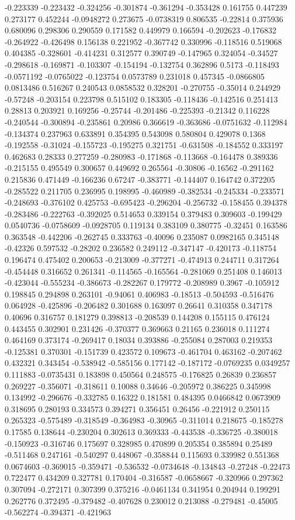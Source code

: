 -0.223339 -0.223432 -0.324256 -0.301874 -0.361294 -0.353428 0.161755 0.447239 0.273177 0.452244 -0.0948272 0.273675 -0.0738319 0.806535 -0.22814 0.375936 0.680096 0.298306 0.290559 0.171582 0.449979 0.166594 -0.202623 -0.176832 -0.264922 -0.426498 0.156138 0.221952 -0.367742 0.330996 -0.118516 0.519068 0.404385 -0.328601 -0.414231 0.312577 0.390749 -0.147965 0.324054 -0.34527 -0.298618 -0.169871 -0.103307 -0.154194 -0.132754 0.362896 0.5173 -0.118493 -0.0571192 -0.0765022 -0.123754 0.0573789 0.231018 0.457345 -0.0866805 0.0813486 0.516267 0.240543 0.0858532 0.328201 -0.270755 -0.35014 0.244929 -0.57248 -0.203154 0.223798 0.515102 0.183305 -0.118436 -0.142516 0.251413 0.28813 0.203921 0.169256 -0.25744 -0.201486 -0.225393 -0.21342 0.116228 -0.240544 -0.300894 -0.235861 0.20986 0.366619 -0.363686 -0.0751632 -0.112984 -0.134374 0.237963 0.633891 0.354395 0.543098 0.580804 0.429078 0.1368 -0.192558 -0.31024 -0.155723 -0.195275 0.321751 -0.631508 -0.184552 0.333197 0.462683 0.28333 0.277259 -0.280983 -0.171868 -0.113668 -0.164478 0.389336 -0.215155 0.495549 0.300657 0.449692 0.265564 -0.30806 -0.16562 -0.291162 0.215836 0.471449 -0.166236 0.67247 -0.383771 -0.144407 0.164742 0.372205 -0.285522 0.211705 0.236995 0.198995 -0.460989 -0.382534 -0.245334 -0.233571 -0.248693 -0.376102 0.425753 -0.695423 -0.296204 -0.256732 -0.158455 0.394378 -0.283486 -0.222763 -0.392025 0.514653 0.339154 0.379483 0.309603 -0.199429 0.0540736 -0.0758609 -0.0928705 0.119134 0.383109 0.380775 -0.32451 0.163586 0.363548 -0.442206 -0.262745 0.333763 -0.40096 0.235087 0.0982165 0.345148 -0.42326 0.597532 -0.28202 0.236582 0.249112 -0.347147 -0.420173 -0.118754 0.196474 0.475402 0.200653 -0.213009 -0.377271 -0.474913 0.244711 0.317264 -0.454448 0.316652 0.261341 -0.114565 -0.165564 -0.281069 0.251408 0.146013 -0.423044 -0.555234 -0.386673 -0.282267 0.179772 -0.208989 0.3967 -0.105912 0.198845 0.294898 0.263101 -0.94061 0.406983 -0.18513 -0.504593 -0.516476 0.064928 -0.425896 -0.206482 0.301688 0.163097 0.26641 0.310358 0.347178 0.40696 0.316757 0.181279 0.398813 -0.208539 0.144208 0.155115 0.476124 0.443455 0.302901 0.231426 -0.370377 0.369663 0.21165 0.236018 0.111274 0.464169 0.373174 -0.269417 0.18034 0.393886 -0.255084 0.287003 0.219353 -0.125381 0.370301 -0.151739 0.423572 0.109673 -0.461704 0.463162 -0.207462 0.432321 0.343454 -0.538942 -0.585156 0.177142 -0.187172 -0.0769235 0.0349257 0.111883 -0.0735431 0.183898 0.450564 0.248575 -0.176825 0.26839 0.236857 0.269227 -0.356071 -0.318611 0.10088 0.34646 -0.205972 0.386225 0.345998 0.134992 -0.296676 -0.332785 0.16322 0.181581 0.484395 0.0466842 0.0673909 0.318695 0.280193 0.334573 0.394271 0.356451 0.26456 -0.221912 0.250115 0.265323 -0.575489 -0.318549 -0.364983 -0.30965 -0.311014 0.218675 -0.185278 0.17585 0.138644 -0.230204 0.302613 0.369333 -0.443538 -0.336725 -0.380018 -0.150923 -0.316746 0.175697 0.328985 0.470899 0.205354 0.385894 0.25489 -0.511468 0.247161 -0.540297 0.448067 -0.358844 0.115693 0.339982 0.551368 0.0674603 -0.369015 -0.359471 -0.536532 -0.0734648 -0.134843 -0.27248 -0.22473 0.722477 0.434209 0.327781 0.170404 -0.316587 -0.0658667 -0.320966 0.297362 0.307094 -0.272171 0.307399 0.375216 -0.0461134 0.341954 0.204944 0.199291 0.262776 0.372495 -0.379482 -0.407628 0.230012 0.213088 -0.279481 -0.45005 -0.562274 -0.394371 -0.421963 